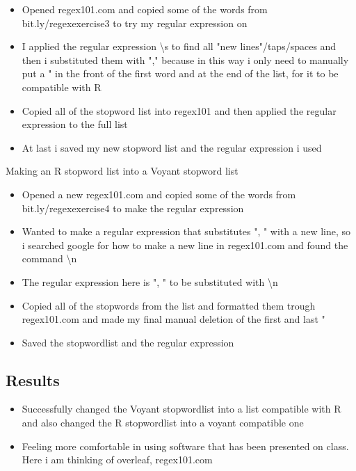 \documentclass{article}
\begin{document}
\begin{itemize}
\item Opened regex101.com and copied some of the words from bit.ly/regexexercise3 to try my regular expression on
\item I applied the regular expression \textbackslash s to find all "new lines"/taps/spaces and then i substituted them with "," because in this way i only need to manually put a " in the front of the first word and at the end of the list, for it to be compatible with R 
\item Copied all of the stopword list into regex101 and then applied the regular expression to the full list
\item At last i saved my new stopword list and the regular expression i used
\end{itemize}

 Making an R stopword list into a Voyant stopword list

\begin{itemize}
\item Opened a new regex101.com and copied some of the words from bit.ly/regexexercise4 to make the regular expression
\item Wanted to make a regular expression that substitutes ", " with a new line, so i searched google for how to make a new line in regex101.com and found the command \textbackslash n 
\item The regular expression here is ", " to be substituted with \textbackslash n 
\item Copied all of the stopwords from the list and formatted them trough regex101.com and made my final manual deletion of the first and last "
\item Saved the stopwordlist and the regular expression 
\end{itemize}
 
\subsection{Results}

\begin{itemize}
\item Successfully changed the Voyant stopwordlist into a list compatible with R and also changed the R stopwordlist into a voyant compatible one
\item Feeling more comfortable in using software that has been presented on class. Here i am thinking of overleaf, regex101.com
\end{itemize}
\end{document}
